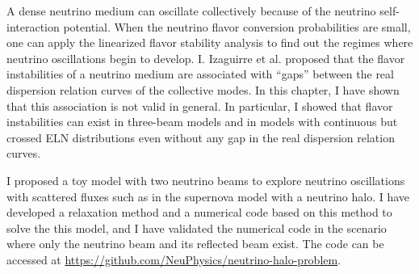 A dense neutrino medium can oscillate collectively because of the neutrino self-interaction potential. When the neutrino flavor conversion probabilities are small, one can apply the linearized flavor stability analysis to find out the regimes where neutrino oscillations begin to develop. I. Izaguirre et al. proposed that the flavor instabilities of a neutrino medium are associated with ``gaps'' between the real dispersion relation curves of the collective modes. In this chapter, I have shown that this association is not valid in general. In particular, I showed that flavor instabilities can exist in three-beam models and in models with continuous but crossed ELN distributions even without any gap in the real dispersion relation curves.

I proposed a toy model with two neutrino beams to explore neutrino oscillations with scattered fluxes such as in the supernova model with a neutrino halo. I have developed a relaxation method and a numerical code based on this method to solve the this model, and I have validated the numerical code in the scenario where only the neutrino beam and its reflected beam exist. The code can be accessed at \url{https://github.com/NeuPhysics/neutrino-halo-problem}.


